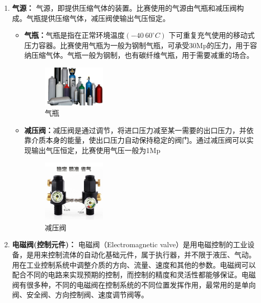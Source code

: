 \documentclass[UTF8]{article} %
\begin{document}
\begin{enumerate}
  \item \textbf{气源：} 
  气源，即提供压缩气体的装置。比赛使用的气源由气瓶和减压阀构成。气瓶提供压缩气体，减压阀使输出气压恒定。
  \begin{itemize}
    \item \textbf{气瓶：}气瓶是指在正常环境温度$(-40~60^{\circ}C)$ 下可重复充气使用的移动式压力容器。比赛使用气瓶为一般为钢制气瓶，可承受30Mp的压力，用于容纳压缩气体。气瓶一般为钢制，也有碳纤维气瓶，用于需要减重的场合。
    
    \begin{figure}[h]
      \centering
      \includegraphics[width=0.3\textwidth]{qi2.png}
      \caption{气瓶}
    \end{figure}

    \item \textbf{减压阀：}减压阀是通过调节，将进口压力减至某一需要的出口压力，并依靠介质本身的能量，使出口压力自动保持稳定的阀门。通过减压阀可以实现输出气压恒定，比赛使用气压一般为1Mp

    \begin{figure}[h]
      \centering
      \includegraphics[width=0.3\textwidth]{qi3.png}
      \caption{减压阀}
    \end{figure}

  \end{itemize}
  \item \textbf{电磁阀(控制元件)：} 电磁阀（Electromagnetic valve）是用电磁控制的工业设备，是用来控制流体的自动化基础元件，属于执行器，并不限于液压、气动。用在工业控制系统中调整介质的方向、流量、速度和其他的参数。电磁阀可以配合不同的电路来实现预期的控制，而控制的精度和灵活性都能够保证。电磁阀有很多种，不同的电磁阀在控制系统的不同位置发挥作用，最常用的是单向阀、安全阀、方向控制阀、速度调节阀等。
  

\end{enumerate}
\end{document}
